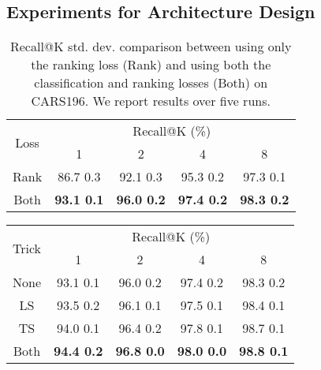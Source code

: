 \documentclass[10pt,twocolumn,letterpaper]{article}
\begin{document}
\begin{CJK}{UTF8}{mj}
\subsection{Experiments for Architecture Design}


\begin{table}[t!]
\begin{center}
\begin{adjustbox}{width=.95\columnwidth,center}
\begin{tabular}{c|cccc}
\hline
\multirow{2}{*}{Loss} & \multicolumn{4}{c}{Recall@K (\%)}                \\ \cline{2-5} 
                       & 1          & 2          & 4          & 8          \\ \hline\hline
Rank                   & 86.7  0.3 & 92.1  0.3 & 95.3  0.2 & 97.3  0.1 \\
Both                   & \textbf{93.1  0.1} & \textbf{96.0  0.2} & \textbf{97.4  0.2} & \textbf{98.3  0.2} \\ \hline
\end{tabular}
\end{adjustbox}


\end{center}
\caption{Recall@K  std. dev. comparison between using only the ranking loss (Rank) and using both the classification and ranking losses (Both) on CARS196.
We report results over five runs.}
\label{table:loss}
\end{table}

\begin{table}[t!]
\begin{center}

\begin{adjustbox}{width=.95\columnwidth,center}
\begin{tabular}{c|cccc}
\hline
\multirow{2}{*}{Trick} & \multicolumn{4}{c}{Recall@K (\%)}                     \\ \cline{2-5} 
                       & 1          & 2          & 4          & 8          \\ \hline\hline
None                   & 93.1  0.1 & 96.0  0.2 & 97.4  0.2 & 98.3  0.2 \\
LS                     & 93.5  0.2 & 96.1  0.1 & 97.5  0.1 & 98.4  0.1 \\
TS                     & 94.0  0.1 & 96.4  0.2 & 97.8  0.1 & 98.7  0.1 \\
Both                   & \textbf{94.4  0.2} & \textbf{96.8  0.0} & \textbf{98.0  0.0} & \textbf{98.8  0.1} \\ \hline
\end{tabular}
\end{adjustbox}



\end{center}
\end{table}
\end{CJK}
\end{document}
